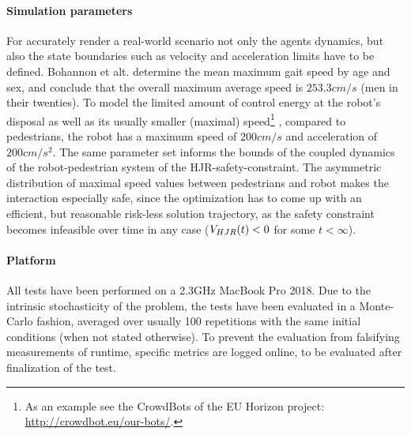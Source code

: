 \paragraph{Simulation parameters}
For accurately render a real-world scenario not only the agents dynamics, but also the state boundaries such as velocity and acceleration limits have to be defined. Bohannon et alt. \cite{Bohannon1997} determine the mean maximum gait speed by age and sex, and conclude that the overall maximum average speed is $253.3 cm/s$ (men in their twenties). To model the limited amount of control energy at the robot's disposal as well as its usually smaller (maximal) speed\footnote{As an example see the CrowdBots of the EU Horizon project: \href{http://crowdbot.eu/our-bots/}{http://crowdbot.eu/our-bots/}.} , compared to pedestrians, the robot has a maximum speed of $200 cm/s$ and acceleration of $200 cm/s^2$. The same parameter set informs the bounds of the coupled dynamics of the robot-pedestrian system of the \ac{HJR}-safety-constraint. The asymmetric distribution of maximal speed values between pedestrians and robot makes the interaction especially safe, since the optimization has to come up with an efficient, but reasonable risk-less solution trajectory, as the safety constraint becomes infeasible over time in any case ($V_{HJR}(t) < 0$ for some $t < \infty$).

\paragraph{Platform} 
All tests have been performed on a 2.3GHz MacBook Pro 2018. Due to the intrinsic stochasticity of the problem, the tests have been evaluated in a Monte-Carlo fashion, averaged over usually 100 repetitions with the same initial conditions (when not stated otherwise). To prevent the evaluation from falsifying measurements of runtime, specific metrics are logged online, to be evaluated after finalization of the test.